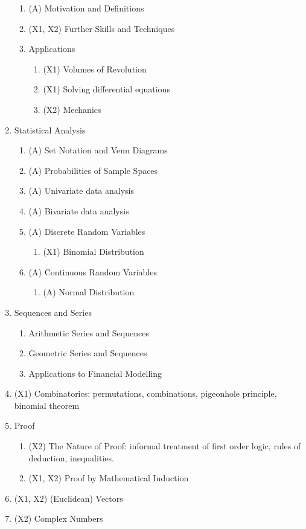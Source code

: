 \documentclass[11pt, a4paper, oneside]{article}
\begin{document}
\begin{enumerate}
\begin{enumerate}
      \item (A) Motivation and Definitions
      \item (X1, X2) Further Skills and Techniques
      \item Applications
        \begin{enumerate}
          \item (X1) Volumes of Revolution
          \item (X1) Solving differential equations
          \item (X2) Mechanics
        \end{enumerate}
    \end{enumerate}
  \item Statistical Analysis
    \begin{enumerate}
      \item (A) Set Notation and Venn Diagrams
      \item (A) Probabilities of Sample Spaces
      \item (A) Univariate data analysis
      \item (A) Bivariate data analysis
      \item (A) Discrete Random Variables
        \begin{enumerate}
          \item (X1) Binomial Distribution
        \end{enumerate}
      \item (A) Continuous Random Variables
        \begin{enumerate}
          \item (A) Normal Distribution
        \end{enumerate}
    \end{enumerate}
  \item Sequences and Series
    \begin{enumerate}
      \item Arithmetic Series and Sequences
      \item Geometric Series and Sequences
      \item Applications to Financial Modelling
    \end{enumerate}
  \item (X1) Combinatorics: permutations, combinations, pigeonhole principle, binomial theorem
  \item Proof
    \begin{enumerate}
      \item (X2) The Nature of Proof: informal treatment of first order logic, rules of deduction, inequalities.
      \item (X1, X2) Proof by Mathematical Induction
    \end{enumerate}
  \item (X1, X2) (Euclidean) Vectors
  \item (X2) Complex Numbers
\end{enumerate}
\end{document}
